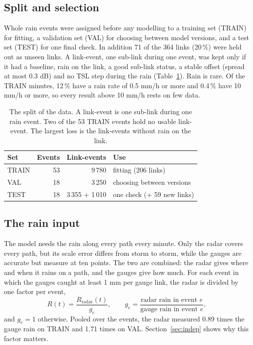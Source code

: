 \documentclass[reprint,aps,pra,amsmath,amssymb,nofootinbib,superscriptaddress]{revtex4-2}
\begin{document}
\subsection{Split and selection}
Whole rain events were assigned before any modelling to a training set (TRAIN) for fitting, a validation set (VAL) for
choosing between model versions, and a test set (TEST) for one final check. In addition 71 of the 364 links (20\,\%) were
held out as unseen links. A link-event, one sub-link during one event, was kept only if it had a baseline, rain on the
link, a good sub-link status, a stable offset (spread at most 0.3 dB) and no TSL step during the rain
(Table~\ref{tab:split}). Rain is rare. Of the TRAIN minutes, 12\,\% have a rain rate of 0.5 mm/h or more and 0.4\,\% have
10 mm/h or more, so every result above 10 mm/h rests on few data.

\begin{table}[b]
\caption{The split of the data. A link-event is one sub-link during one rain event. Two of the 53 TRAIN events hold no
usable link-event. The largest loss is the link-events without rain on the link.}
\label{tab:split}
\begin{ruledtabular}
\begin{tabular}{lrrl}
Set & Events & Link-events & Use\\
\hline
TRAIN & 53 & 9\,780 & fitting (206 links)\\
VAL & 18 & 3\,250 & choosing between versions\\
TEST & 18 & 3\,355 + 1\,010 & one check (+ 59 new links)\\
\end{tabular}
\end{ruledtabular}
\end{table}

\subsection{The rain input}
The model needs the rain along every path every minute. Only the radar covers every path, but its scale error differs
from storm to storm, while the gauges are accurate but measure at ten points. The two are combined: the radar gives where
and when it rains on a path, and the gauges give how much. For each event in which the gauges caught at least 1 mm per
gauge link, the radar is divided by one factor per event,
\begin{equation}
R(t) = \frac{R_{\mathrm{radar}}(t)}{g_e}, \qquad g_e = \frac{\text{radar rain in event } e}{\text{gauge rain in event } e},
\label{eq:ge}
\end{equation}
and $g_e = 1$ otherwise. Pooled over the events, the radar measured 0.89 times the gauge rain on TRAIN and 1.71 times on
VAL. Section~\ref{sec:indep} shows why this factor matters.
\end{document}
